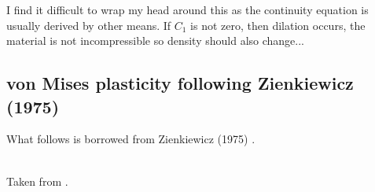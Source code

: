 I find it difficult to wrap my head around this as the continuity equation 
is usually derived by other means. 
If $C_1$ is not zero, then dilation occurs, the material is not incompressible
so density should also change...  


\subsection{von Mises plasticity following Zienkiewicz (1975)}

What follows is borrowed from Zienkiewicz (1975) \cite{zien75}.


\begin{center}
\\
{\captionfont Taken from \textcite{zien75}.}
\end{center}

